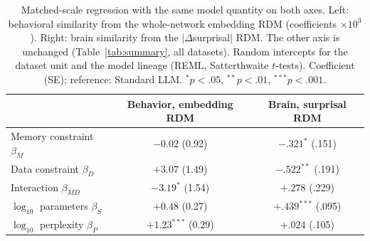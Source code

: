 \begin{table}[t]
\centering
\small
\caption{Matched-scale regression with the same model quantity on both axes. Left: behavioral similarity from the
whole-network embedding RDM (coefficients $\times 10^3$). Right: brain similarity from the $|\Delta$surprisal$|$ RDM. The other
axis is unchanged (Table~\ref{tab:summary}, all datasets). Random intercepts for the dataset unit and the model lineage
(REML, Satterthwaite $t$-tests). Coefficient (SE); reference: Standard LLM. $^{*}p<.05$,
$^{**}p<.01$, $^{***}p<.001$.}
\label{tab:rsa-sameq}
\begin{tabular}{lcc}
\toprule
 & Behavior, embedding RDM & Brain, surprisal RDM \\
\midrule
Memory constraint $\beta_M$ & $-0.02$ (0.92) & $-.321^{*}$ (.151) \\
Data constraint $\beta_D$ & $+3.07$ (1.49) & $-.522^{**}$ (.191) \\
Interaction $\beta_{MD}$ & $-3.19^{*}$ (1.54) & $+.278$ (.229) \\
$\log_{10}$ parameters $\beta_S$ & $+0.48$ (0.27) & $+.439^{***}$ (.095) \\
$\log_{10}$ perplexity $\beta_P$ & $+1.23^{***}$ (0.29) & $+.024$ (.105) \\
\bottomrule
\end{tabular}
\end{table}
